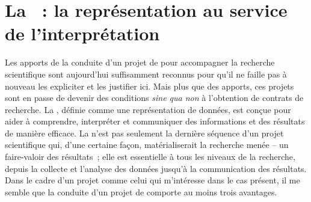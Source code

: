 \section{La ~: la représentation au service de l’interprétation}

Les apports de la conduite d’un projet de  pour accompagner la recherche scientifique sont aujourd’hui suffisamment reconnus pour qu’il ne faille pas à nouveau les expliciter et les justifier ici. Mais plus que des apports, ces projets sont en passe de devenir des conditions \textit{sine qua non} à l’obtention de contrats de recherche. La , définie comme une représentation de données, est conçue pour aider à comprendre, interpréter et communiquer des informations et des résultats de manière efficace. La  n’est pas seulement la dernière séquence d’un projet scientifique qui, d’une certaine façon, matérialiserait la recherche menée – un faire-valoir des résultats~; elle est essentielle à tous les niveaux de la recherche, depuis la collecte et l’analyse des données jusqu'à la communication des résultats. Dans le cadre d’un projet comme celui qui m’intéresse dans le cas présent, il me semble que la conduite d’un projet de  comporte au moins trois avantages.
